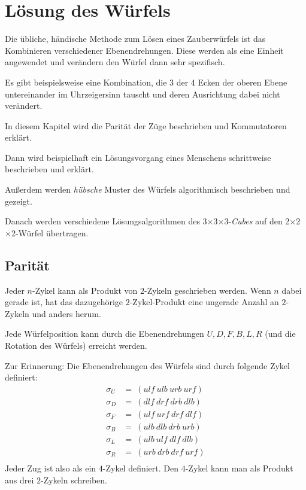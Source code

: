 \documentclass[12pt,a4paper, usenames, dvipsnames]{article}
\newcommand{\Ttwo}{2$\times$2$\times$2-}
\newcommand{\Tthree}{3$\times$3$\times$3-}
\begin{document}
\section{Lösung des Würfels}

Die übliche, händische Methode zum Lösen eines Zauberwürfels ist das Kombinieren verschiedener Ebenendrehungen. Diese werden als eine Einheit angewendet und verändern den Würfel dann sehr spezifisch. 


Es gibt beispielsweise eine Kombination, die 3 der 4 Ecken der oberen Ebene untereinander im Uhrzeigersinn tauscht und deren Ausrichtung dabei nicht verändert. 

In diesem Kapitel wird die Parität der Züge beschrieben und Kommutatoren erklärt.

Dann wird beispielhaft ein Lösungsvorgang eines Menschens schrittweise beschrieben und erklärt.

Außerdem werden \textit{hübsche} Muster des Würfels algorithmisch beschrieben und gezeigt.

Danach werden verschiedene Lösungsalgorithmen des \Tthree \textit{Cubes} auf den \Ttwo Würfel übertragen.

%
%
%
%
%
%
%
%
%
%
%
%
%
%
%
%
%
%
%
%
\subsection*{Parität}

Jeder $n$-Zykel kann als Produkt von $2$-Zykeln geschrieben werden. Wenn $n$ dabei gerade ist, hat das dazugehörige $2$-Zykel-Produkt eine ungerade Anzahl an $2$-Zykeln und anders herum. \cite{TD}


Jede Würfelposition kann durch die Ebenendrehungen $U, D, F, B, L, R$ (und die Rotation des Würfels) erreicht werden. 


Zur Erinnerung: Die Ebenendrehungen des Würfels sind durch folgende Zykel definiert:
\begin{align*}
\sigma_U & =\ (ulf \ ulb \ urb \ urf) \\
\sigma_D & =\ (dlf \ drf \ drb \ dlb) \\
\sigma_F & =\ (ulf \ urf \ drf \ dlf) \\
\sigma_B & =\ (ulb \ dlb \ drb \ urb) \\
\sigma_L & =\ (ulb \ ulf \ dlf \ dlb) \\
\sigma_R & =\ (urb \ drb \ drf \ urf) \\
\end{align*}
Jeder Zug ist also als ein $4$-Zykel definiert. Den $4$-Zykel kann man als Produkt aus drei $2$-Zykeln schreiben. 
\end{document}
